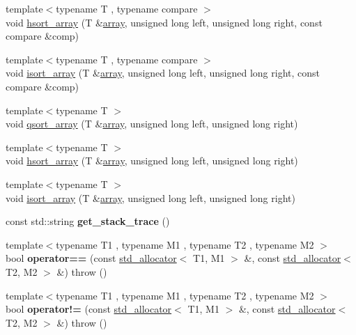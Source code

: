 \begin{DoxyCompactItemize}
\item 
{\footnotesize template$<$typename T , typename compare $>$ }\\void \hyperlink{namespacedlib_ad2483eaef67b51922017370294317395}{hsort\_\-array} (T \&\hyperlink{classdlib_1_1array}{array}, unsigned long left, unsigned long right, const compare \&comp)
\item 
{\footnotesize template$<$typename T , typename compare $>$ }\\void \hyperlink{namespacedlib_a67b8e8c3f84cc73d4335f36131d6dd3f}{isort\_\-array} (T \&\hyperlink{classdlib_1_1array}{array}, unsigned long left, unsigned long right, const compare \&comp)
\item 
{\footnotesize template$<$typename T $>$ }\\void \hyperlink{namespacedlib_a603b4c76cedf8bff5975b76817f27eaa}{qsort\_\-array} (T \&\hyperlink{classdlib_1_1array}{array}, unsigned long left, unsigned long right)
\item 
{\footnotesize template$<$typename T $>$ }\\void \hyperlink{namespacedlib_ad6abbf5d4ec2109706476146835059b7}{hsort\_\-array} (T \&\hyperlink{classdlib_1_1array}{array}, unsigned long left, unsigned long right)
\item 
{\footnotesize template$<$typename T $>$ }\\void \hyperlink{namespacedlib_af630f6e36af2fed569135ae72246e016}{isort\_\-array} (T \&\hyperlink{classdlib_1_1array}{array}, unsigned long left, unsigned long right)
\item 
\hypertarget{namespacedlib_a963489c2ce136f1924ae92bf47ab12a7}{
const std::string {\bfseries get\_\-stack\_\-trace} ()}
\label{namespacedlib_a963489c2ce136f1924ae92bf47ab12a7}

\item 
\hypertarget{namespacedlib_ad04e79a06dc35940470c2d4422051d21}{
{\footnotesize template$<$typename T1 , typename M1 , typename T2 , typename M2 $>$ }\\bool {\bfseries operator==} (const \hyperlink{classdlib_1_1std__allocator}{std\_\-allocator}$<$ T1, M1 $>$ \&, const \hyperlink{classdlib_1_1std__allocator}{std\_\-allocator}$<$ T2, M2 $>$ \&)  throw ()}
\label{namespacedlib_ad04e79a06dc35940470c2d4422051d21}

\item 
\hypertarget{namespacedlib_a5419d341c5a35f9fa10c05cc5291f851}{
{\footnotesize template$<$typename T1 , typename M1 , typename T2 , typename M2 $>$ }\\bool {\bfseries operator!=} (const \hyperlink{classdlib_1_1std__allocator}{std\_\-allocator}$<$ T1, M1 $>$ \&, const \hyperlink{classdlib_1_1std__allocator}{std\_\-allocator}$<$ T2, M2 $>$ \&)  throw ()}
\label{namespacedlib_a5419d341c5a35f9fa10c05cc5291f851}


\end{DoxyCompactItemize}

